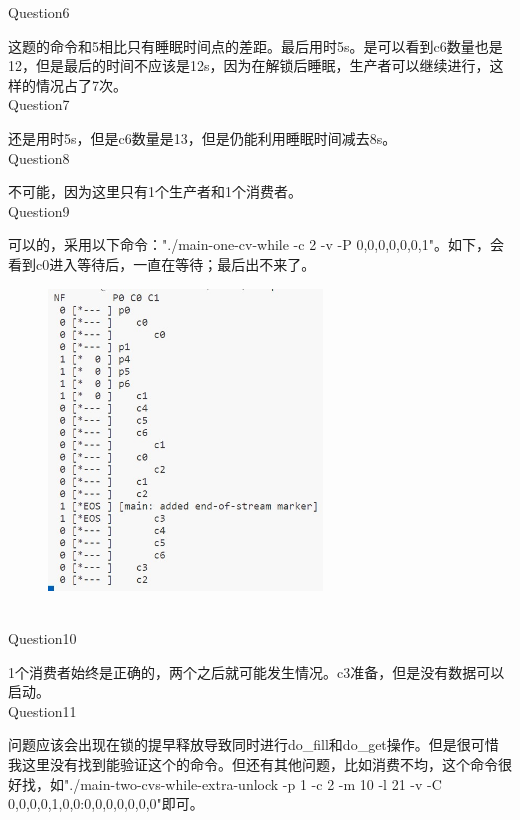 \documentclass[11pt]{article}
\begin{document}
Question6\par
这题的命令和5相比只有睡眠时间点的差距。最后用时5s。是可以看到c6数量也是12，但是最后的时间不应该是12s，因为在解锁后睡眠，生产者可以继续进行，这样的情况占了7次。\\
Question7\par
还是用时5s，但是c6数量是13，但是仍能利用睡眠时间减去8s。\\
Question8\par
不可能，因为这里只有1个生产者和1个消费者。\\
Question9\par
可以的，采用以下命令："./main-one-cv-while -c 2 -v -P 0,0,0,0,0,0,1"。如下，会看到c0进入等待后，一直在等待；最后出不来了。
\begin{figure}[h]
    \begin{center}
        \includegraphics[height=8cm]{hw8-6.jpg}
    \end{center}
\end{figure}\\
Question10\par
1个消费者始终是正确的，两个之后就可能发生情况。c3准备，但是没有数据可以启动。\\
Question11\par
问题应该会出现在锁的提早释放导致同时进行do\_fill和do\_get操作。但是很可惜我这里没有找到能验证这个的命令。但还有其他问题，比如消费不均，这个命令很好找，如"./main-two-cvs-while-extra-unlock -p 1 -c 2 -m 10 -l 21 -v -C 0,0,0,0,1,0,0:0,0,0,0,0,0,0"即可。
\end{document}
